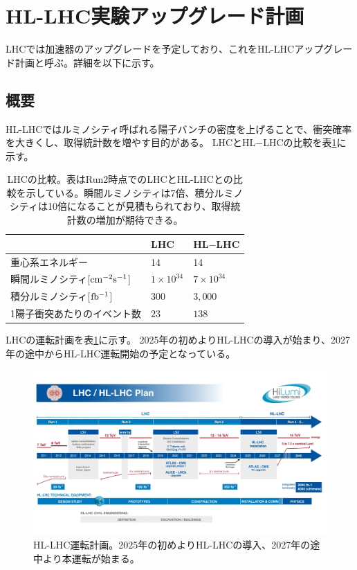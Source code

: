 \clearpage
\section{HL-LHC実験アップグレード計画}
LHCでは加速器のアップグレードを予定しており、これをHL-LHCアップグレード計画と呼ぶ。詳細を以下に示す。
\subsection{概要}
HL-LHCではルミノシティ呼ばれる陽子バンチの密度を上げることで、衝突確率を大きくし、取得統計数を増やす目的がある。
LHCとHL$-$LHCの比較を表\ref{compare_lhc}に示す。

\begin{table}[tbp]
\begin{center}
\caption[LHCの比較]{LHCの比較\cite{1-6}。表はRun2時点でのLHCとHL-LHCとの比較を示している。瞬間ルミノシティは7倍、積分ルミノシティは10倍になることが見積もられており、取得統計数の増加が期待できる。}
\label{compare_lhc}
  \begin{tabular}{|lll|} \hline
    & LHC & HL$-$LHC \\ \hline
    重心系エネルギー & 14 & 14 \\
    瞬間ルミノシティ[$\rm{cm^{-2}s^{-1}}$] & $1\times 10^{34}$ & $7\times10^{34}$ \\
    積分ルミノシティ[$\rm{fb^{-1}}$] & $300$ & $3,000$ \\
    1陽子衝突あたりのイベント数 & $23$ & $138$ \\ \hline 
  \end{tabular}
\end{center}
\end{table}

LHCの運転計画を表\ref{hllhc_plan}に示す。
2025年の初めよりHL-LHCの導入が始まり、2027年の途中からHL-LHC運転開始の予定となっている。
\begin{figure}[bpt]\centering
\includegraphics[width=12cm]{hllhc_plan}
\caption[HL-LHC運転計画]{HL-LHC運転計画\cite{1-7}。2025年の初めよりHL-LHCの導入、2027年の途中より本運転が始まる。}
\label{hllhc_plan}
\end{figure}

